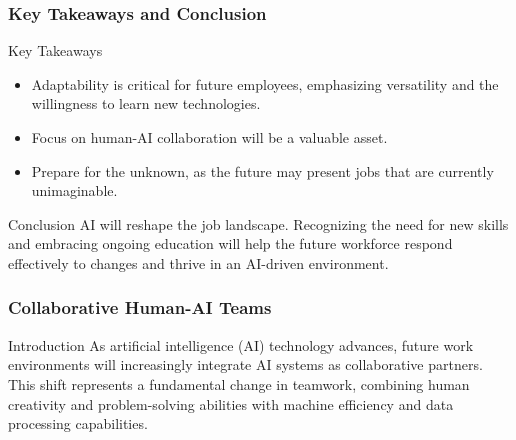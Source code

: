 \documentclass[aspectratio=169]{beamer}
\begin{document}
\begin{frame}[fragile]
    \frametitle{Key Takeaways and Conclusion}
    \begin{block}{Key Takeaways}
        \begin{itemize}
            \item Adaptability is critical for future employees, emphasizing versatility and the willingness to learn new technologies.
            \item Focus on human-AI collaboration will be a valuable asset.
            \item Prepare for the unknown, as the future may present jobs that are currently unimaginable.
        \end{itemize}
    \end{block}
    
    \begin{block}{Conclusion}
        AI will reshape the job landscape. Recognizing the need for new skills and embracing ongoing education will help the future workforce respond effectively to changes and thrive in an AI-driven environment.
    \end{block}
\end{frame}

\begin{frame}[fragile]
    \frametitle{Collaborative Human-AI Teams}
    \begin{block}{Introduction}
        As artificial intelligence (AI) technology advances, future work environments will increasingly integrate AI systems as collaborative partners. This shift represents a fundamental change in teamwork, combining human creativity and problem-solving abilities with machine efficiency and data processing capabilities.
    \end{block}
\end{frame}
\end{document}
